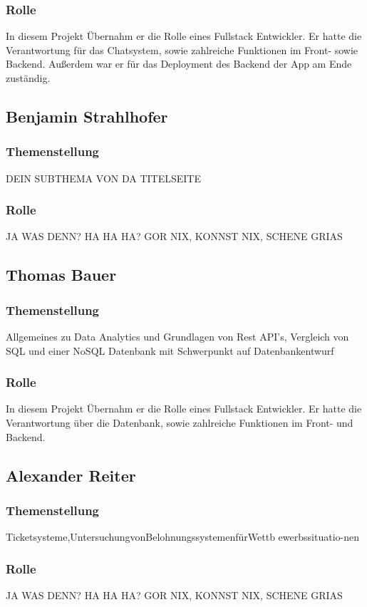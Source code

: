 \subsubsection{Rolle}
In diesem Projekt Übernahm er die Rolle eines Fullstack Entwickler. Er hatte die Verantwortung für das Chatsystem,
sowie zahlreiche Funktionen im Front- sowie Backend. Außerdem war er für das Deployment des Backend der App am Ende zuständig.

\subsection{Benjamin Strahlhofer}
\subsubsection{Themenstellung}
DEIN SUBTHEMA VON DA TITELSEITE
\subsubsection{Rolle}
JA WAS DENN? HA HA HA? GOR NIX, KONNST NIX, SCHENE GRIAS

\subsection{Thomas Bauer}
\subsubsection{Themenstellung}
Allgemeines zu Data Analytics und Grundlagen von Rest API's, Vergleich von SQL und einer NoSQL Datenbank mit Schwerpunkt auf Datenbankentwurf
\subsubsection{Rolle}
In diesem Projekt Übernahm er die Rolle eines Fullstack Entwickler. Er hatte die Verantwortung über die Datenbank, 
sowie zahlreiche Funktionen im Front- und Backend. 

\subsection{Alexander Reiter}
\subsubsection{Themenstellung}
Ticketsysteme,UntersuchungvonBelohnungssystemenfürWettb ewerbssituatio-nen
\subsubsection{Rolle}
JA WAS DENN? HA HA HA? GOR NIX, KONNST NIX, SCHENE GRIAS

\newpage